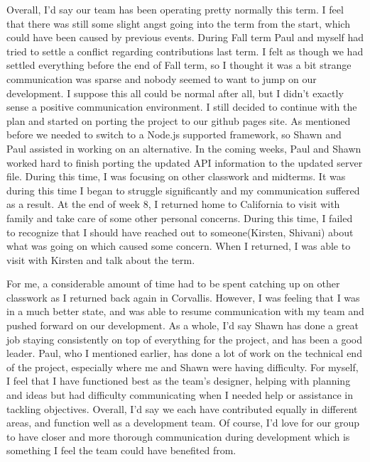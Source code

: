 \documentclass[letterpaper, 10pt, draftclsnofoot, compsoc, onecolumn]{IEEEtran}
\begin{document}
Overall, I'd say our team has been operating pretty normally this term. I feel that there was still some slight angst going into the term from the start, which could have been caused by previous events. During Fall term Paul and myself had tried to settle a conflict regarding contributions last term. I felt as though we had settled everything before the end of Fall term, so I thought it was a bit strange communication was sparse and nobody seemed to want to jump on our development. I suppose this all could be normal after all, but I didn't exactly sense a positive communication environment. I still decided to continue with the plan and started on porting the project to our github pages site. As mentioned before we needed to switch to a Node.js supported framework, so Shawn and Paul assisted in working on an alternative. In the coming weeks, Paul and Shawn worked hard to finish porting the updated API information to the updated server file. During this time, I was focusing on other classwork and midterms. It was during this time I began to struggle significantly and my communication suffered as a result. At the end of week 8, I returned home to California to visit with family and take care of some other personal concerns.  During this time, I failed to recognize that I should have reached out to someone(Kirsten, Shivani) about what was going on which caused some concern. When I returned, I was able to visit with Kirsten and talk about the term. 

For me, a considerable amount of time had to be spent catching up on other classwork as I returned back again in Corvallis. However, I was feeling that I was in a much better state, and was able to resume communication with my team and pushed forward on our development. As a whole, I'd say Shawn has done a great job staying consistently on top of everything for the project, and has been a good leader. Paul, who I mentioned earlier, has done a lot of work on the technical end of the project, especially where me and Shawn were having difficulty. For myself, I feel that I have functioned best as the team's designer, helping with planning and ideas but had difficulty communicating when I needed help or assistance in tackling objectives. Overall, I'd say we each have contributed equally in different areas, and function well as a development team. Of course, I'd love for our group to have closer and more thorough  communication during development which is something I feel the team could have benefited from. 
\end{document}
